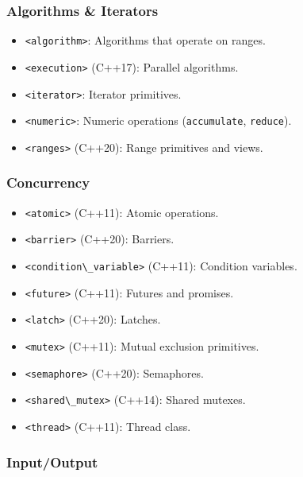 \hypertarget{algorithms-iterators}{%
\subsubsection{Algorithms \& Iterators}\label{algorithms-iterators}}

\begin{itemize}
\tightlist
\item
  \passthrough{\lstinline!<algorithm>!}: Algorithms that operate on
  ranges.
\item
  \passthrough{\lstinline!<execution>!} (C++17): Parallel algorithms.
\item
  \passthrough{\lstinline!<iterator>!}: Iterator primitives.
\item
  \passthrough{\lstinline!<numeric>!}: Numeric operations
  (\passthrough{\lstinline!accumulate!},
  \passthrough{\lstinline!reduce!}).
\item
  \passthrough{\lstinline!<ranges>!} (C++20): Range primitives and
  views.
\end{itemize}

\hypertarget{concurrency}{%
\subsubsection{Concurrency}\label{concurrency}}

\begin{itemize}
\tightlist
\item
  \passthrough{\lstinline!<atomic>!} (C++11): Atomic operations.
\item
  \passthrough{\lstinline!<barrier>!} (C++20): Barriers.
\item
  \passthrough{\lstinline!<condition\_variable>!} (C++11): Condition
  variables.
\item
  \passthrough{\lstinline!<future>!} (C++11): Futures and promises.
\item
  \passthrough{\lstinline!<latch>!} (C++20): Latches.
\item
  \passthrough{\lstinline!<mutex>!} (C++11): Mutual exclusion
  primitives.
\item
  \passthrough{\lstinline!<semaphore>!} (C++20): Semaphores.
\item
  \passthrough{\lstinline!<shared\_mutex>!} (C++14): Shared mutexes.
\item
  \passthrough{\lstinline!<thread>!} (C++11): Thread class.
\end{itemize}

\hypertarget{inputoutput}{%
\subsubsection{Input/Output}\label{inputoutput}}

